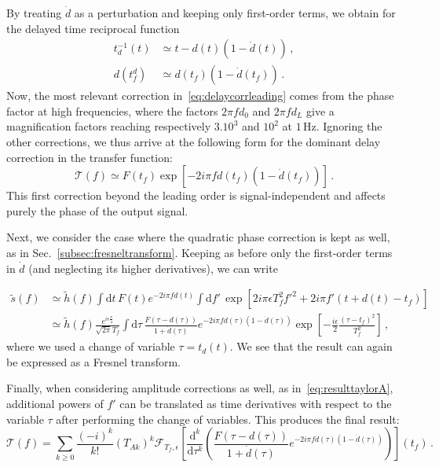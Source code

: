 \documentclass[aps,showpacs,twocolumn,
prd,superscriptaddress,nofootinbib]{revtex4-1}
\newcommand{\be}{\begin{equation}}
\newcommand{\ee}{\end{equation}}
\newcommand\ud{{\mathrm{d}}}
\newcommand\calF{{\mathcal{F}}}
\newcommand\calT{{\mathcal{T}}}
\newcommand{\nn}{\nonumber}
\newcommand{\Hz}{\,\mathrm{Hz}}
\newcommand{\tf}{t_{f}}
\newcommand{\Tf}{T_{f}}
\begin{document}
By treating $\dot{d}$ as a perturbation and keeping only first-order terms, we obtain for the delayed time reciprocal function
\begin{align}
	t_{d}^{-1}(t) &\simeq t-d(t) (1-\dot{d}(t)) \,,\nn\\
	d(t_{f}^{d}) &\simeq d(t_{f}) ( 1 - \dot{d}(t_{f})) \,.
\end{align}
Now, the most relevant correction in~\eqref{eq:delaycorrleading} comes from the phase factor at high frequencies, where the factors $2\pi f d_{0}$ and $2\pi f d_{L}$ give a magnification factors reaching respectively $3.10^{3}$ and $10^{2}$ at $1\Hz$. Ignoring the other corrections, we thus arrive at the following form for the dominant delay correction in the transfer function:
\be
	\calT(f) \simeq F(t_{f})\exp\left[ -2i\pi f d(t_{f}) (1-\dot{d}(t_{f})) \right] \,.
\ee
This first correction beyond the leading order is signal-independent and affects purely the phase of the output signal.

Next, we consider the case where the quadratic phase correction is kept as well, as in Sec.~\ref{subsec:fresneltransform}. Keeping as before only the first-order terms in $\dot{d}$ (and neglecting its higher derivatives), we can write
\begin{widetext}
\begin{align}
	\tilde{s}(f) &\simeq \tilde{h}(f) \int \ud t \, F(t) e^{-2i\pi f d(t)} \int \ud f' \, \exp\left[ 2i\pi \epsilon \Tf^{2} f'^{2} + 2i\pi f' (t+d(t) - \tf) \right] \nn\\
	&\simeq \tilde{h}(f) \frac{e^{i\epsilon\frac{\pi}{4}}}{\sqrt{2\pi}\Tf} \int \ud \tau \, \frac{F(\tau - d(\tau))}{1+\dot{d}(\tau)} e^{-2i\pi f d(\tau)(1-\dot{d}(\tau))}\exp\left[ -\frac{i\epsilon}{2} \frac{(\tau - \tf)^{2}}{\Tf^{2}} \right] \,,
\end{align}
where we used a change of variable $\tau = t_{d}(t)$. We see that the result can again be expressed as a Fresnel transform.

Finally, when considering amplitude corrections as well, as in~\eqref{eq:resulttaylorA}, additional powers of $f'$ can be translated as time derivatives with respect to the variable $\tau$ after performing the change of variables. This produces the final result:
\be\label{eq:transferfinal}
	\calT(f) = \sum\limits_{k \geq 0} \frac{(-i)^{k}}{k!} (T_{Ak})^{k} \calF_{\Tf, \epsilon} \left[ \frac{\ud^{k}}{\ud \tau^{k}} \left( \frac{F(\tau - d(\tau))}{1+\dot{d}(\tau)} e^{-2i\pi f d(\tau)(1-\dot{d}(\tau))} \right) \right] (\tf) \,.
\ee
\end{widetext}
\end{document}
